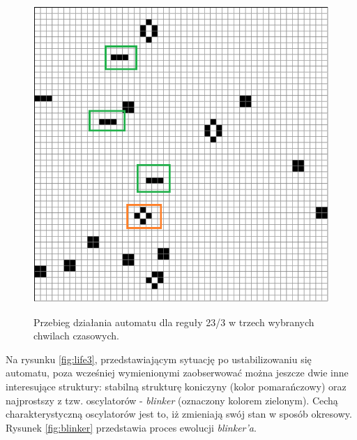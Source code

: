 \documentclass[12pt] {article}
\begin{document}
\begin{figure}[H]
\begin{minipage}[t]{.3\textwidth}
        \label{fig:life2}
    \end{minipage}
    \hfill
    \begin{minipage}[t]{.3\textwidth}
        \centering
        \includegraphics[width=\textwidth]{res/23_3_650.png}
        \label{fig:life3}
    \end{minipage}  
    \caption{Przebieg działania automatu dla reguły 23/3 w trzech wybranych chwilach czasowych.}
    \label{fig:life123}
\end{figure}


Na rysunku \ref{fig:life3}, przedstawiającym sytuację po ustabilizowaniu się automatu, poza wcześniej wymienionymi zaobserwować można jeszcze dwie inne interesujące struktury: stabilną strukturę koniczyny (kolor pomarańczowy) oraz najprostszy z tzw. oscylatorów - \textit{blinker} (oznaczony kolorem zielonym). Cechą charakterystyczną oscylatorów jest to, iż zmieniają swój stan w sposób okresowy. Rysunek \ref{fig:blinker} przedstawia proces ewolucji \textit{blinker'a}. 
\end{document}
